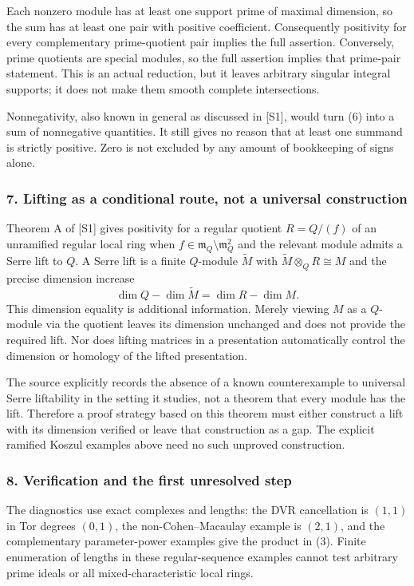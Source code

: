 \documentclass[11pt]{article}
\begin{document}
Each nonzero module has at least one support prime of maximal dimension, so the sum has at least one pair with positive coefficient. Consequently positivity for every complementary prime-quotient pair implies the full assertion. Conversely, prime quotients are special modules, so the full assertion implies that prime-pair statement. This is an actual reduction, but it leaves arbitrary singular integral supports; it does not make them smooth complete intersections.

Nonnegativity, also known in general as discussed in [S1], would turn (6) into a sum of nonnegative quantities. It still gives no reason that at least one summand is strictly positive. Zero is not excluded by any amount of bookkeeping of signs alone.

\subsubsection{7. Lifting as a conditional route, not a universal construction}
Theorem A of [S1] gives positivity for a regular quotient $R=Q/(f)$ of an unramified regular local ring when $f\in\mathfrak m_Q\setminus\mathfrak m_Q^2$ and the relevant module admits a Serre lift to $Q$. A Serre lift is a finite $Q$-module $\widetilde M$ with $\widetilde M\otimes_QR\cong M$ and the precise dimension increase
\[
 \dim Q-\dim\widetilde M=\dim R-\dim M.
\]
This dimension equality is additional information. Merely viewing $M$ as a $Q$-module via the quotient leaves its dimension unchanged and does not provide the required lift. Nor does lifting matrices in a presentation automatically control the dimension or homology of the lifted presentation.

The source explicitly records the absence of a known counterexample to universal Serre liftability in the setting it studies, not a theorem that every module has the lift. Therefore a proof strategy based on this theorem must either construct a lift with its dimension verified or leave that construction as a gap. The explicit ramified Koszul examples above need no such unproved construction.

\subsubsection{8. Verification and the first unresolved step}
The diagnostics use exact complexes and lengths: the DVR cancellation is $(1,1)$ in Tor degrees $(0,1)$, the non-Cohen--Macaulay example is $(2,1)$, and the complementary parameter-power examples give the product in (3). Finite enumeration of lengths in these regular-sequence examples cannot test arbitrary prime ideals or all mixed-characteristic local rings.
\end{document}
